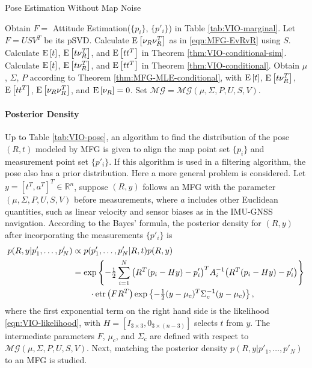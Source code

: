 \begin{table}
	\caption{Pose Estimation Without Map Noise}
	\label{tab:VIO-pose}
	\begin{algorithmic}[1]
		\algrule[0.8pt]
		\algrule
		\State Obtain $F=$ Attitude Estimation($\{p_i\}$, $\{p'_i\}$) in Table \ref{tab:VIO-marginal}.
		\State Let $F = USV^T$ be its pSVD.
		\State Calculate $\mathrm{E}\left[ \nu_R\nu_R^T \right]$ as in \eqref{eqn:MFG-EvRvR} using $S$.
		\State Calculate $\mathrm{E}\left[ t \right]$, $\mathrm{E}\left[ t\nu_R^T \right]$, and $\mathrm{E}\left[ tt^T \right]$ in Theorem \ref{thm:VIO-conditional-sim}.
		\Else
		\State Calculate $\mathrm{E}\left[ t \right]$, $\mathrm{E}\left[ t\nu_R^T \right]$, and $\mathrm{E}\left[ tt^T \right]$ in Theorem \ref{thm:VIO-conditional}.
		\EndIf
		\State Obtain $\mu$, $\Sigma$, $P$ according to Theorem \ref{thm:MFG-MLE-conditional}, with $\mathrm{E}\left[ t \right]$, $\mathrm{E}\left[ t\nu_R^T \right]$, $\mathrm{E}\left[ tt^T \right]$, $\mathrm{E}\left[ \nu_R\nu_R^T \right]$, and $\mathrm{E}\left[ \nu_R \right] = 0$.
		\State Set $\mathcal{MG} = \mathcal{MG}(\mu,\Sigma,P,U,S,V)$.
		\EndProcedure
		\algrule[0.8pt]
	\end{algorithmic}
\end{table}

\paragraph{Posterior Density}

Up to Table \eqref{tab:VIO-pose}, an algorithm to find the distribution of the pose $(R,t)$ modeled by MFG is given to align the map point set $\{p_i\}$ and measurement point set $\{p'_i\}$.
If this algorithm is used in a filtering algorithm, the pose also has a prior distribution.
Here a more general problem is considered.
Let $y = [t^T, a^T]^T \in \mathbb{R}^n$, suppose $(R,y)$ follows an MFG with the parameter $(\mu,\Sigma,P,U,S,V)$ before measurements, where $a$ includes other Euclidean quantities, such as linear velocity and sensor biases as in the IMU-GNSS navigation.
According to the Bayes' formula, the posterior density for $(R,y)$ after incorporating the measurements $\{p'_i\}$ is
\begin{align} \label{eqn:VIO-posterior}
	p(R,y|p'_1,\ldots,p'_N) &\propto p(p'_1,\ldots,p'_N|R,t) p(R,y) \nonumber \\
	&= \exp\left\{ -\tfrac{1}{2}\sum_{i=1}^N \big(R^T(p_i-Hy)-p'_i\big)^T A_i^{-1} \big(R^T(p_i-Hy)-p'_i\big) \right\} \nonumber \\
	&\qquad \cdot \mathrm{etr}\left( FR^T \right) \exp\left\{ -\tfrac{1}{2}(y-\mu_c)^T \Sigma_c^{-1} (y-\mu_c) \right\},
\end{align}
where the first exponential term on the right hand side is the likelihood \eqref{eqn:VIO-likelihood}, with $H = [I_{3\times 3}, 0_{3\times (n-3)}]$ selects $t$ from $y$.
The intermediate parameters $F$, $\mu_c$, and $\Sigma_c$ are defined with respect to $\mathcal{MG}(\mu,\Sigma,P,U,S,V)$.
Next, matching the posterior density $p(R,y|p'_1,\ldots,p'_N)$ to an MFG is studied.

